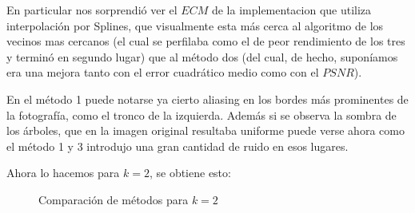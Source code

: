 En particular nos sorprendió ver el $ECM$ de la implementacion que utiliza interpolación por Splines, que visualmente esta más cerca al algoritmo de los vecinos mas cercanos (el cual se perfilaba como el de peor rendimiento de los tres y terminó en segundo lugar) que al método dos (del cual, de hecho, suponíamos era una mejora tanto con el error cuadrático medio como con el $PSNR$).

En el método 1 puede notarse ya cierto aliasing en los bordes más prominentes de la fotografía, como el tronco de la izquierda. Además si se observa la sombra de los árboles, que en la imagen original resultaba uniforme puede verse ahora como el método 1 y 3 introdujo una gran cantidad de ruido en esos lugares.

Ahora lo hacemos para $k=2$, se obtiene esto:

\begin{figure}[H]
    \centering
    \qquad
    \qquad
    \caption{Comparación de métodos para $k = 2$}
    \label{fig:example}%
\end{figure}

